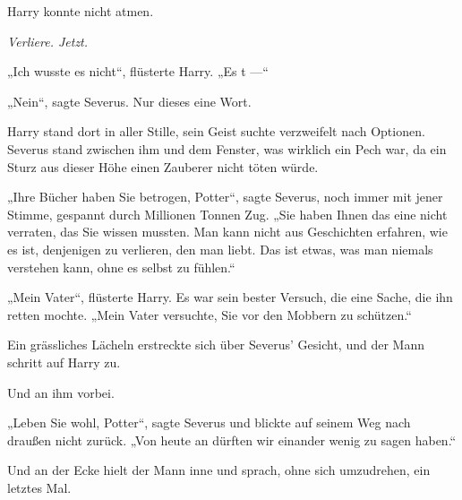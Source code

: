 Harry konnte nicht atmen.

\emph{Verliere. Jetzt.}

„Ich wusste es nicht“, flüsterte Harry.
„Es t —“

„Nein“, sagte Severus. Nur dieses eine Wort.

Harry stand dort in aller Stille, sein Geist suchte verzweifelt nach Optionen. Severus stand zwischen ihm und dem Fenster, was wirklich ein Pech war, da ein Sturz aus dieser Höhe einen Zauberer nicht töten würde.

„Ihre Bücher haben Sie betrogen, Potter“, sagte Severus, noch immer mit jener Stimme, gespannt durch Millionen Tonnen Zug.
„Sie haben Ihnen das eine nicht verraten, das Sie wissen mussten. Man kann nicht aus Geschichten erfahren, wie es ist, denjenigen zu verlieren, den man liebt. Das ist etwas, was man niemals verstehen kann, ohne es selbst zu fühlen.“

„Mein Vater“, flüsterte Harry. Es war sein bester Versuch, die eine Sache, die ihn retten mochte.
„Mein Vater versuchte, Sie vor den Mobbern zu schützen.“

Ein grässliches Lächeln erstreckte sich über Severus’ Gesicht, und der Mann schritt auf Harry zu.

Und an ihm vorbei.

„Leben Sie wohl, Potter“, sagte Severus und blickte auf seinem Weg nach draußen nicht zurück.
„Von heute an dürften wir einander wenig zu sagen haben.“

Und an der Ecke hielt der Mann inne und sprach, ohne sich umzudrehen, ein letztes Mal.

